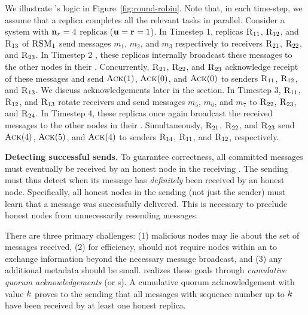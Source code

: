 We illustrate \Scrooge's logic in Figure~\ref{fig:round-robin}.
Note that, in each time-step, we assume that a replica completes all the relevant tasks in parallel. Consider a system
with $\textbf{n}_{r} = 4$ replicas ($\textbf{u}_{}= \textbf{r}_{} = 1$).
In Timestep 1, replicas $\textsc{R}_{{1}{1}}$, $\textsc{R}_{{1}{2}}$, and $\textsc{R}_{{1}{3}}$
of $\textsc{RSM}{}_1$ send messages
 $m_1$, $m_2$, and $m_3$ respectively to receivers $\textsc{R}_{{2}{1}}$, $\textsc{R}_{{2}{2}}$, and $\textsc{R}_{{2}{3}}$. 
In Timestep 2 , these replicas internally broadcast these messages to the other nodes
in their \RSM{}.
Concurrently, $\textsc{R}_{{2}{1}}$, $\textsc{R}_{{2}{2}}$, and $\textsc{R}_{{2}{3}}$ acknowledge receipt of these messages and send $\textsc{Ack}(1)$, $\textsc{Ack}(0)$, and $\textsc{Ack}(0)$ to senders 
$\textsc{R}_{{1}{1}}$, $\textsc{R}_{{1}{2}}$, and $\textsc{R}_{{1}{3}}$.
We discuss acknowledgements later in the section.
In Timestep 3, $\textsc{R}_{{1}{1}}$, $\textsc{R}_{{1}{2}}$, and $\textsc{R}_{{1}{3}}$ rotate receivers and
send messages $m_5$, $m_6$, and $m_7$ to $\textsc{R}_{{2}{2}}$, $\textsc{R}_{{2}{3}}$, and $\textsc{R}_{{2}{4}}$.
In Timestep 4, these replicas once again broadcast the received messages to the other nodes in their \RSM{}.
Simultaneously, $\textsc{R}_{{2}{1}}$, $\textsc{R}_{{2}{2}}$, and $\textsc{R}_{{2}{3}}$ send $\textsc{Ack}(4)$, $\textsc{Ack}(5)$, and $\textsc{Ack}(4)$ to senders 
$\textsc{R}_{{1}{4}}$, $\textsc{R}_{{1}{1}}$, and $\textsc{R}_{{1}{2}}$, respectively. 
\par \textbf{Detecting successful sends.} To guarantee correctness, all committed messages must eventually be received by an honest node in the receiving \RSM{}. The sending \RSM{} must thus detect when its message has \textit{definitely} been received by an honest node. Specifically, all honest nodes in the sending \RSM{} (not just the sender) must learn that a message was successfully delivered. This is necessary to preclude honest nodes from unnecessarily resending messages.

There are three primary challenges: (1) malicious nodes may lie about the set of messages received, (2) for efficiency, \Scrooge{} should not require nodes within an \RSM{} to exchange information beyond the necessary message broadcast, and (3) any additional metadata should be small. \Scrooge{} realizes these goals through \textit{cumulative quorum acknowledgements} (or \quack{}s). A cumulative quorum acknowledgement with value $k$ proves to the sending \RSM{} that all messages with sequence number up to $k$ have been received by at least one honest replica. 

